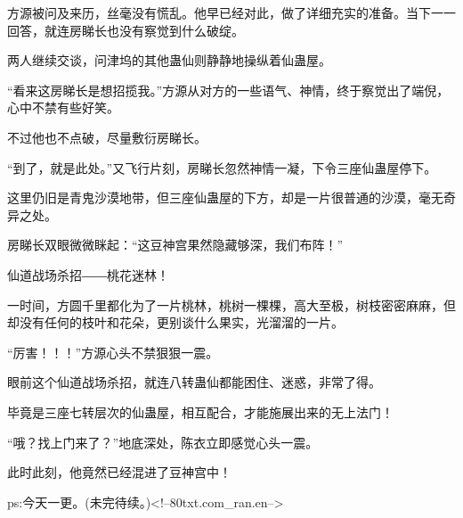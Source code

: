 \begin{this_body}
方源被问及来历，丝毫没有慌乱。他早已经对此，做了详细充实的准备。当下一一回答，就连房睇长也没有察觉到什么破绽。

两人继续交谈，问津坞的其他蛊仙则静静地操纵着仙蛊屋。

“看来这房睇长是想招揽我。”方源从对方的一些语气、神情，终于察觉出了端倪，心中不禁有些好笑。

不过他也不点破，尽量敷衍房睇长。

“到了，就是此处。”又飞行片刻，房睇长忽然神情一凝，下令三座仙蛊屋停下。

这里仍旧是青鬼沙漠地带，但三座仙蛊屋的下方，却是一片很普通的沙漠，毫无奇异之处。

房睇长双眼微微眯起：“这豆神宫果然隐藏够深，我们布阵！”

仙道战场杀招――桃花迷林！

一时间，方圆千里都化为了一片桃林，桃树一棵棵，高大至极，树枝密密麻麻，但却没有任何的枝叶和花朵，更别谈什么果实，光溜溜的一片。

“厉害！！！”方源心头不禁狠狠一震。

眼前这个仙道战场杀招，就连八转蛊仙都能困住、迷惑，非常了得。

毕竟是三座七转层次的仙蛊屋，相互配合，才能施展出来的无上法门！

“哦？找上门来了？”地底深处，陈衣立即感觉心头一震。

此时此刻，他竟然已经混进了豆神宫中！

ps:今天一更。(未完待续。)<!--80txt.com\_ran.en-->

\end{this_body}

